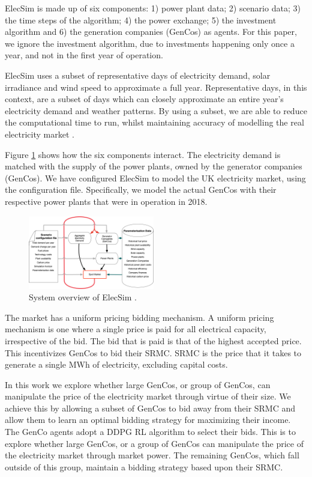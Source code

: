 \documentclass[conference]{IEEEtran}
\begin{document}
ElecSim is made up of six components: 1) power plant data; 2) scenario data; 3) the time steps of the algorithm; 4) the power exchange; 5) the investment algorithm and 6) the generation companies (GenCos) as agents. For this paper, we ignore the investment algorithm, due to investments happening only once a year, and not in the first year of operation. 

ElecSim uses a subset of representative days of electricity demand, solar irradiance and wind speed to approximate a full year. Representative days, in this context, are a subset of days which can closely approximate an entire year's electricity demand and weather patterns. By using a subset, we are able to reduce the computational time to run, whilst maintaining accuracy of modelling the real electricity market \cite{Kell2020}.

Figure \ref{fig:model_details} shows how the six components interact. The electricity demand is matched with the supply of the power plants, owned by the generator companies (GenCos). We have configured ElecSim to model the UK electricity market, using the configuration file. Specifically, we model the actual GenCos with their respective power plants that were in operation in 2018.



\begin{figure}
    \includegraphics[width=0.49\textwidth]{figures/methedology/system-overview-v2}
    \caption{System overview of ElecSim \cite{Kell}.}
    \label{fig:model_details}
\end{figure}

The market has a uniform pricing bidding mechanism. A uniform pricing mechanism is one where a single price is paid for all electrical capacity, irrespective of the bid. The bid that is paid is that of the highest accepted price. This incentivizes GenCos to bid their SRMC. SRMC is the price that it takes to generate a single MWh of electricity, excluding capital costs. 

In this work we explore whether large GenCos, or group of GenCos, can manipulate the price of the electricity market through virtue of their size. We achieve this by allowing a subset of GenCos to bid away from their SRMC and allow them to learn an optimal bidding strategy for maximizing their income. The GenCo agents adopt a DDPG RL algorithm to select their bids. This is to explore whether large GenCos, or a group of GenCos can manipulate the price of the electricity market through market power. The remaining GenCos, which fall outside of this group, maintain a bidding strategy based upon their SRMC.
\end{document}
